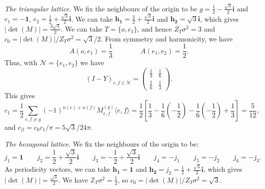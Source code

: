 \documentclass[11pt]{article}
\theoremstyle{remark}
\def\Z{\mathbb{Z}}
\def\cG{\mathcal{G}}
\begin{document}
\emph{The triangular lattice.}
We fix the neighbours of the origin to be $g = \frac{1}{2} - \frac{\sqrt{3}}{2} \mathbf{i}$
and $e_1 = -\mathbf{1}$, $e_2 = \frac{1}{2} + \frac{\sqrt{3}}{2} \mathbf{i}$. We can take
$\mathbf{h_1} = \frac{3}{2} + \frac{\sqrt{3}}{2} \mathbf{i}$ and
$\mathbf{h_2} = \sqrt{3} \mathbf{i}$, which gives $|\det(M)| = \frac{3 \sqrt{3}}{2}$.
We can take $T = \{ o, e_1 \}$, and hence $Z_T \sigma^2 = 3$ and 
$c_0 = |\det(M)| / Z_T \sigma^2 = \sqrt{3}/2$.
From symmetry and harmonicity, we have
\[ A(o,e_1) = \frac{1}{3} \qquad\qquad
   A(e_1,e_2) = \frac{1}{2}. \]
Thus, with $\mathcal{N} = \{ e_1, e_2 \}$ we have
\[ (I - Y)_{e,f \in \mathcal{N}}
   = \begin{pmatrix}
   \frac{1}{3} & \frac{1}{6} \\[0.2cm]
   \frac{1}{6} & \frac{1}{3}
   \end{pmatrix}. \]
This gives
\[ c_1 
   = \frac{1}{2} \sum_{e,f \not= g} (-1)^{n(e)+n(f)} M^{(g)}_{e,f} \langle e, f \rangle 
   = \frac{1}{2} \left[ \frac{1}{3} - \frac{1}{6} \left( -\frac{1}{2} \right) - \frac{1}{6} \left( - \frac{1}{2} \right) + \frac{1}{3} \right] 
   = \frac{5}{12}, \]
and $c_\cG = c_0 c_1 / \pi = 5 \sqrt{3} / 24 \pi$.

\emph{The hexagonal lattice.} 
We fix the neighbours of the origin to be:
\[ j_1 = \mathbf{1} \qquad 
   j_2 = \frac{1}{2} + \frac{\sqrt{3}}{2} \mathbf{i} \qquad
   j_3 = -\frac{1}{2} + \frac{\sqrt{3}}{2} \mathbf{i} \qquad
   j_4 = - j_1 \qquad 
   j_5 = - j_2 \qquad
   j_6 = - j_3. \]
As periodicity vectors, we can take $\mathbf{h_1} = \mathbf{1}$ and 
$\mathbf{h_2} = j_2 = \frac{1}{2} + \frac{\sqrt{3}}{2} \mathbf{i}$, which gives
$|\det(M)| = \frac{\sqrt{3}}{2}$. We have $\Z_T \sigma^2 = \frac{1}{2}$, so
$c_0 = |\det(M)| / Z_T \sigma^2 = \sqrt{3}$.
\end{document}
